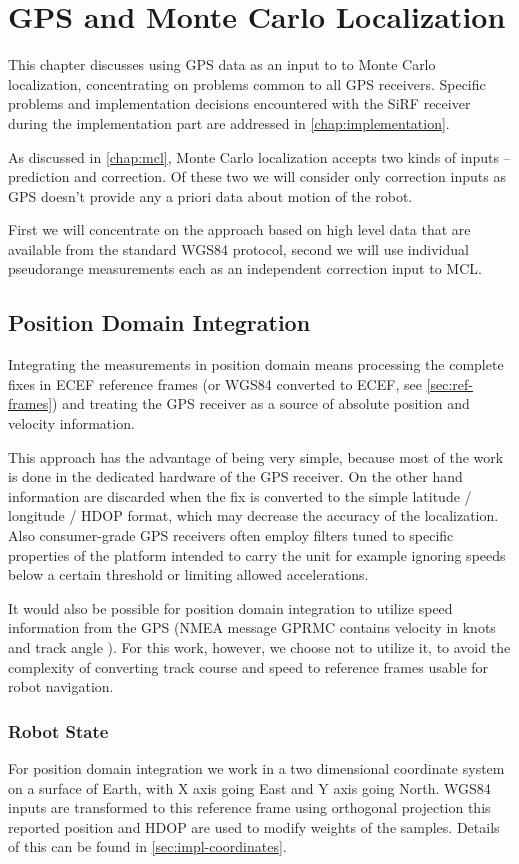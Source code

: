 \chapter{GPS and Monte Carlo Localization}
\label{chap:gps-and-mcl}

This chapter discusses using GPS data as an input to to Monte Carlo localization,
concentrating on problems common to all GPS receivers.
Specific problems and implementation decisions encountered with the SiRF receiver
during the implementation part are addressed in \cref{chap:implementation}.

As discussed in \cref{chap:mcl}, Monte Carlo localization accepts two kinds of
inputs -- prediction and correction.
Of these two we will consider only correction inputs as GPS doesn't provide any
a priori data about motion of the robot.

First we will concentrate on the approach based on high level data that are available
from the standard WGS84 protocol,
second we will use individual pseudorange measurements each as an independent
correction input to MCL.

\section{Position Domain Integration}
Integrating the measurements in position domain means processing the complete
fixes in ECEF reference frames (or WGS84 converted to ECEF, see \cref{sec:ref-frames})
and treating the GPS receiver as a source of absolute position and velocity information.

This approach has the advantage of being very simple, because most of the work
is done in the dedicated hardware of the GPS receiver.
On the other hand information are discarded when the fix is converted to the simple
latitude / longitude / HDOP format, which may decrease the accuracy of the
localization.
Also consumer-grade GPS receivers often employ filters tuned to specific properties
of the platform intended to carry the unit for example ignoring speeds
below a certain threshold or limiting allowed accelerations.

It would also be possible for position domain integration to utilize speed information
from the GPS (NMEA message GPRMC contains velocity in knots and track angle \cite{depriest}).
For this work, however, we choose not to utilize it, to avoid the complexity of converting
track course and speed to reference frames usable for robot navigation.

\subsection{Robot State}
For position domain integration we work in a two dimensional coordinate
system on a surface of Earth, with X axis going East and Y axis going North.
WGS84 inputs are transformed to this reference frame using orthogonal projection
this reported position and HDOP are used to modify weights of the samples.
Details of this can be found in \cref{sec:impl-coordinates}.

